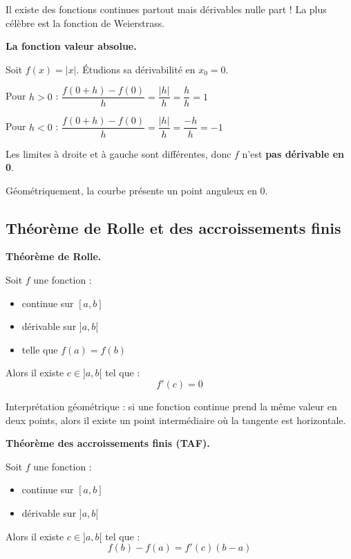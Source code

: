 \documentclass[../PolyS2.tex]{subfiles}
\begin{document}
\begin{Rmq}
Il existe des fonctions continues partout mais dérivables nulle part ! La plus célèbre est la fonction de Weierstrass.
\end{Rmq}

\begin{Ex}
\textbf{La fonction valeur absolue.}

Soit $f(x) = |x|$. Étudions sa dérivabilité en $x_0 = 0$.

Pour $h > 0$ : $\dfrac{f(0+h) - f(0)}{h} = \dfrac{|h|}{h} = \dfrac{h}{h} = 1$

Pour $h < 0$ : $\dfrac{f(0+h) - f(0)}{h} = \dfrac{|h|}{h} = \dfrac{-h}{h} = -1$

Les limites à droite et à gauche sont différentes, donc $f$ n'est \textbf{pas dérivable en 0}.

Géométriquement, la courbe présente un \og point anguleux \fg{} en 0.
\end{Ex}

\subsection{Théorème de Rolle et des accroissements finis}

\begin{Thm}
\textbf{Théorème de Rolle.}

Soit $f$ une fonction :
\begin{itemize}
    \item continue sur $[a, b]$
    \item dérivable sur $]a, b[$
    \item telle que $f(a) = f(b)$
\end{itemize}

Alors il existe $c \in ]a, b[$ tel que :
$$f'(c) = 0$$
\end{Thm}

\begin{Rmq}
Interprétation géométrique : si une fonction continue prend la même valeur en deux points, alors il existe un point intermédiaire où la tangente est horizontale.
\end{Rmq}

\begin{Thm}
\textbf{Théorème des accroissements finis (TAF).}

Soit $f$ une fonction :
\begin{itemize}
    \item continue sur $[a, b]$
    \item dérivable sur $]a, b[$
\end{itemize}

Alors il existe $c \in ]a, b[$ tel que :
$$f(b) - f(a) = f'(c)(b - a)$$
\end{Thm}
\end{document}
